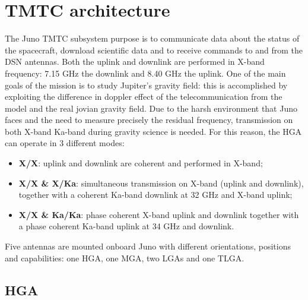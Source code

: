 \section{TMTC architecture}
\label{sec:TMTC_architecture}



The Juno TMTC subsystem purpose is to communicate data about the status of the spacecraft, download scientific data and to receive commands to and from the DSN antennas. Both the uplink and downlink are performed in X-band frequency: 7.15 GHz the downlink and 8.40 GHz the uplink. One of the main goals of the mission is to study Jupiter's gravity field: this is accomplished by exploiting the difference in doppler effect of the telecommunication from the model and the real jovian gravity field. Due to the harsh environment that Juno faces and the need to measure precisely the residual frequency, transmission on both X-band Ka-band during gravity science is needed. 
For this reason, the HGA can operate in 3 different modes: 

\begin{itemize}
\item \textbf{X/X}: uplink and downlink are coherent and performed in X-band;
\end{itemize}

\begin{itemize}
\item \textbf{X/X \& X/Ka}: simultaneous transmission on X-band (uplink and downlink), together with a coherent Ka-band downlink at 32 GHz and X-band uplink;
\item \textbf{X/X \& Ka/Ka}: phase coherent X-band uplink and downlink together with a phase coherent Ka-band uplink at 34 GHz and downlink.
\end{itemize}
Five antennas are mounted onboard Juno with different orientations, positions and capabilities: one HGA, one MGA, two LGAs and one TLGA.


\subsection{HGA}
\label{sec:hga}


